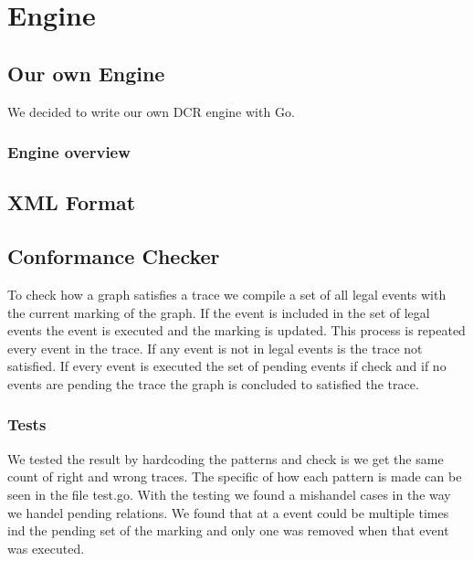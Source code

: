 \section*{Engine}

\subsection*{Our own Engine}
We decided to write our own DCR engine with Go.

\subsubsection*{Engine overview}

\subsection*{XML Format}

\subsection*{Conformance Checker}
To check how a graph satisfies a trace we compile a set of all legal events
with the current marking of the graph. If the event is included in the set of legal
events the event is executed and the marking is updated. This process is repeated
every event in the trace. If any event is not in legal events is the trace not
satisfied. If every event is executed the set of pending events if check and if no
events are pending the trace the graph is concluded to satisfied the trace.

\subsubsection*{Tests}
We tested the result by hardcoding the patterns and check is we get the same
count of right and wrong traces. The specific of how each pattern is made can be
seen in the file test.go. With the testing we found a mishandel cases in the way
we handel pending relations. We found that at a event could be multiple times
ind the pending set of the marking and only one was removed when that event was
executed.
